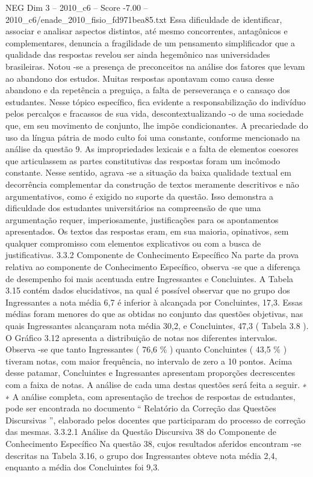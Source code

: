 \begin{textsample}{NEG Dim 3 – 2010\_c6 – Score -7.00 – 2010\_c6/enade\_2010\_fisio\_fd971bea85.txt}
Essa dificuldade de identificar, associar e analisar aspectos distintos, até mesmo concorrentes, antagônicos e complementares, denuncia a fragilidade de um pensamento simplificador que a qualidade das respostas revelou ser ainda hegemônico nas universidades brasileiras.
Notou -se a presença de preconceitos na análise dos fatores que levam ao abandono dos estudos.
Muitas respostas apontavam como causa desse abandono e da repetência a preguiça, a falta de perseverança e o cansaço dos estudantes.
Nesse tópico específico, fica evidente a responsabilização do indivíduo pelos percalços e fracassos de sua vida, descontextualizando -o de uma sociedade que, em seu movimento de conjunto, lhe impõe condicionantes.
A precariedade do uso da língua pátria de modo culto foi uma constante, conforme mencionado na análise da questão 9.
As impropriedades lexicais e a falta de elementos coesores que articulassem as partes constitutivas das respostas foram um incômodo constante.
Nesse sentido, agrava -se a situação da baixa qualidade textual em decorrência complementar da construção de textos meramente descritivos e não argumentativos, como é exigido no suporte da questão.
Isso demonstra a dificuldade dos estudantes universitários na compreensão de que uma argumentação requer, imperiosamente, justificações para os apontamentos apresentados.
Os textos das respostas eram, em sua maioria, opinativos, sem qualquer compromisso com elementos explicativos ou com a busca de justificativas. 3.3.2 Componente de Conhecimento Específico Na parte da prova relativa ao componente de Conhecimento Específico, observa -se que a diferença de desempenho foi mais acentuada entre Ingressantes e Concluintes.
A Tabela 3.15 contém dados elucidativos, na qual é possível observar que no grupo dos Ingressantes a nota média 6,7 é inferior à alcançada por Concluintes, 17,3.
Essas médias foram menores do que as obtidas no conjunto das questões objetivas, nas quais Ingressantes alcançaram nota média 30,2, e Concluintes, 47,3 ( Tabela 3.8 ).
O Gráfico 3.12 apresenta a distribuição de notas nos diferentes intervalos.
Observa -se que tanto Ingressantes ( 76,6 \% ) quanto Concluintes ( 43,5 \% ) tiveram notas, com maior frequência, no intervalo de zero a 10 pontos.
Acima desse patamar, Concluintes e Ingressantes apresentam proporções decrescentes com a faixa de notas.
A análise de cada uma destas questões será feita a seguir. ∗ ∗ A análise completa, com apresentação de trechos de respostas de estudantes, pode ser encontrada no documento “ Relatório da Correção das Questões Discursivas ”, elaborado pelos docentes que participaram do processo de correção das mesmas. 3.3.2.1 Análise da Questão Discursiva 38 do Componente de Conhecimento Específico Na questão 38, cujos resultados aferidos encontram -se descritas na Tabela 3.16, o grupo dos Ingressantes obteve nota média 2,4, enquanto a média dos Concluintes foi 9,3.

\end{textsample}
